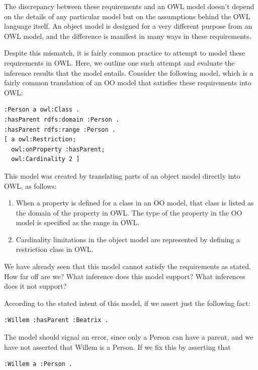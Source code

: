 The discrepancy between these requirements and an OWL model doesn't
depend on the details of
any particular model but on the assumptions behind the OWL language
itself. An object model is designed for a very different purpose from an
OWL model, and the difference is manifest in many ways in these
requirements.

Despite this mismatch, it is fairly common practice to attempt to model
these requirements in OWL. Here, we outline one such attempt and
evaluate the inference results that the model entails. Consider the
following model, which is a fairly common translation of an OO model
that satisfies these requirements into OWL:

\begin{lstlisting}
:Person a owl:Class .
:hasParent rdfs:domain :Person .
:hasParent rdfs:range :Person .
[ a owl:Restriction;
  owl:onProperty :hasParent;
  owl:Cardinality 2 ]
\end{lstlisting}

This model was created by translating parts of an object model directly
into OWL, as follows:

\begin{enumerate}
\item When a property is defined for a class in an OO model, that class is
listed as the domain of the property in OWL. The type of the property in
the OO model is specified as the range in OWL.

\item Cardinality limitations in the object model are represented by
defining a restriction class in OWL.
\end{enumerate}

We have already seen that this model cannot satisfy the requirements as
stated. How far off are we? What inference does this model support? What
inferences does it not support?

According to the stated intent of this model, if we assert just the
following fact:

\begin{lstlisting}
:Willem :hasParent :Beatrix .
\end{lstlisting}

The model should signal an error, since only a Person can have a parent,
and we have not asserted that Willem is a Person. If we fix this by
asserting that

\begin{lstlisting}
:Willem a :Person .
\end{lstlisting}

